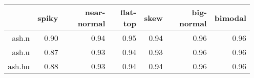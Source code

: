 \begin{tabular}{rrrrrrr}
  \toprule  & spiky & near-normal & flat-top & skew & big-normal & bimodal \\ 
  \midrule ash.n & 0.90 & 0.94 & 0.95 & 0.94 & 0.96 & 0.96 \\ 
  ash.u & 0.87 & 0.93 & 0.94 & 0.93 & 0.96 & 0.96 \\ 
  ash.hu & 0.88 & 0.93 & 0.94 & 0.94 & 0.96 & 0.96 \\ 
   \bottomrule \end{tabular}

